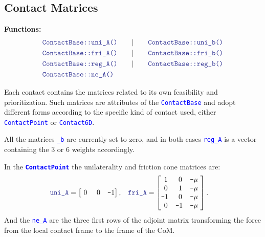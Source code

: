 \documentclass[12pt]{article}
\newcommand{\code}[2][Blue]{\textcolor{#1}{\texttt{#2}}}
\newcommand{\codebf}[2][Blue]{\textcolor{#1}{\texttt{\textbf{#2}}}}
\begin{document}
\subsection{Contact Matrices}
\hrulefill

{\bf Functions:}
    \begin{align*}
        &\code{ContactBase::uni\_A()}\qquad|\qquad
        \code{ContactBase::uni\_b()}\\
        &\code{ContactBase::fri\_A()}\qquad|\qquad
        \code{ContactBase::fri\_b()}\\
        &\code{ContactBase::reg\_A()}\qquad|\qquad
        \code{ContactBase::reg\_b()}\\
        &\code{ContactBase::ne\_A()}\\
    \end{align*}

Each contact contains the matrices related to its own feasibility and prioritization. Such matrices are attributes of the \code{ContactBase} and adopt different forms according to the specific kind of contact used, either \code{ContactPoint} or \code{Contact6D}.

All the matrices \code{\_b} are currently set to zero, and in both cases \code{reg\_A} is a vector containing the $3$ or $6$ weights accordingly.

In the \codebf{ContactPoint} the unilaterality and friction cone matrices are:
%
\begin{align*}
    &\code{uni\_A} = \begin{bmatrix}
       ~0        & ~0     & \texttt{-}1
    \end{bmatrix}, &&
    \code{fri\_A} = \begin{bmatrix}
        ~1 & ~0 & \texttt{-}\mu ~  \\
        ~0 & ~1 & \texttt{-}\mu ~  \\
        \texttt{-}1 & ~0 & \texttt{-}\mu~ \\
        ~0 & \texttt{-}1 & \texttt{-}\mu~ \\
    \end{bmatrix}.
\end{align*}
%
And the \code{ne\_A} are the three first rows of the adjoint matrix transforming the force from the local contact frame to the frame of the CoM.
\end{document}
